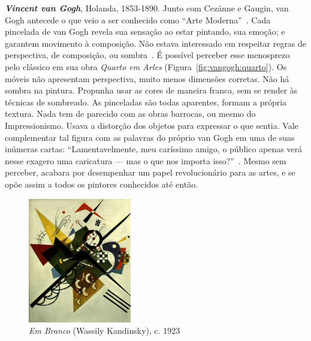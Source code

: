 \textbf{\emph{Vincent van Gogh}}, Holanda, 1853-1890. Junto com
Cezánne e Gaugin, van Gogh antecede o que veio a ser conhecido como
``Arte Moderna''~\cite{gombrich}. Cada pincelada de van Gogh revela
sua sensação ao estar pintando, sua emoção; e garantem movimento à
composição. Não estava interessado em respeitar regras de perspectiva,
de composição, ou sombra~\cite{hulsker}. É possível perceber esse
menosprezo pelo clássico em sua obra \textit{Quarto em Arles}
(Figura~\ref{fig:vangogh:quarto}). Os móveis não apresentam
perspectiva, muito menos dimensões corretas. Não há sombra na
pintura. Propunha usar as cores de maneira franca, sem se render às
técnicas de sombreado. As pinceladas são todas aparentes, formam a
própria textura. Nada tem de parecido com as obras barrocas, ou mesmo
do Impressionismo. Usava a distorção dos objetos para expressar o que
sentia. Vale complementar tal figura com as palavras do próprio van
Gogh em uma de suas inúmeras cartas: ``Lamentavelmente, meu caríssimo
amigo, o público apenas verá nesse exagero uma caricatura --- mas o
que nos importa isso?''~\cite{van1958}. Mesmo sem perceber, acabara
por desempenhar um papel revolucionário para as artes, e se opõe assim
a todos os pintores conhecidos até então.

\begin{figure}
  \begin{center}
    \includegraphics[width=0.4\textwidth]{figs/kandinsky_white.png}
  \end{center}
  \caption{\emph{Em Branco} (Wassily Kandinsky), c. 1923}
  \label{fig:kandinsky:white}
\end{figure}


